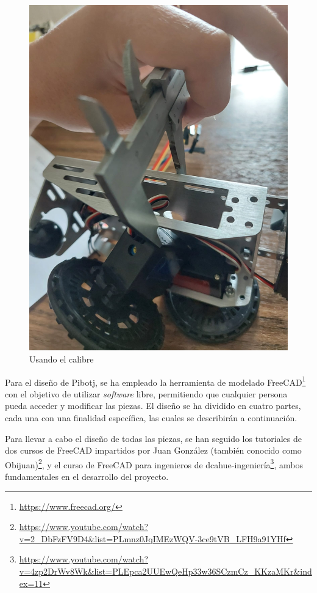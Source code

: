 \begin{figure}[ht!]
\begin{minipage}{0.4\linewidth}
		\includegraphics[width=\linewidth]{figs/cap5/calib2.jpeg}
		\caption*{\centering}
	\end{minipage}
	\caption{Usando el calibre}
	\label{fig:calibre}
\end{figure}

\setcounter{footnote}{64}

Para el diseño de Pibotj, se ha empleado la herramienta de modelado FreeCAD\footnote{\url{https://www.freecad.org/}} con el objetivo de utilizar \textit{software} libre, permitiendo que cualquier persona pueda acceder y modificar las piezas. El diseño se ha dividido en cuatro partes, cada una con una finalidad específica, las cuales se describirán a continuación.

Para llevar a cabo el diseño de todas las piezas, se han seguido los tutoriales de dos cursos de FreeCAD impartidos por Juan González (también conocido como Obijuan)\footnote{\url{https://www.youtube.com/watch?v=2_DbFzFV9D4&list=PLmnz0JqIMEzWQV-3ce9tVB_LFH9a91YHf}}, y el curso de FreeCAD para ingenieros de dcahue-ingeniería\footnote{\url{https://www.youtube.com/watch?v=4zp2DrWv8Wk&list=PLEpca2UUEwQeHp33w36SCzmCz_KKzaMKr&index=11}}, ambos fundamentales en el desarrollo del proyecto.

